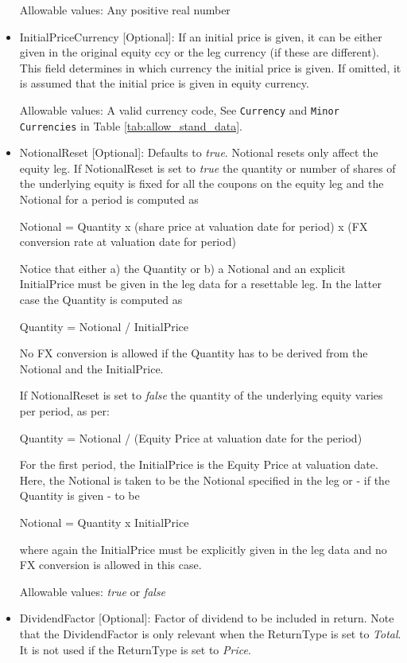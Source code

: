\begin{itemize}
Allowable values: Any positive real number

\item InitialPriceCurrency [Optional]: If an initial price is given, it can be either given in the original equity ccy
  or the leg currency (if these are different). This field determines in which currency the initial price is given. If
  omitted, it is assumed that the initial price is given in equity currency.

Allowable values: A valid currency code, See \lstinline!Currency! and \lstinline!Minor Currencies! in Table \ref{tab:allow_stand_data}.

\item NotionalReset [Optional]: Defaults to \emph{true}.  Notional resets only affect the equity leg. If NotionalReset
  is set to \emph{true} the quantity or number of shares of the underlying equity is fixed for all the coupons on the
  equity leg and the Notional for a period is computed as

  Notional = Quantity x (share price at valuation date for period) x (FX conversion rate at valuation date for period)

  Notice that either a) the Quantity or b) a Notional and an explicit InitialPrice must be given in the leg data for a
  resettable leg. In the latter case the Quantity is computed as

  Quantity = Notional / InitialPrice

  No FX conversion is allowed if the Quantity has to be derived from the Notional and the InitialPrice.

  If NotionalReset is set to \emph{false} the quantity of the underlying equity varies per period, as per:
  
  Quantity = Notional / (Equity Price at valuation date for the period)

For the first period, the InitialPrice is the Equity Price at valuation date.
Here, the Notional is taken to be the Notional specified in the leg or - if the Quantity is given - to be

  Notional = Quantity x InitialPrice

  where again the InitialPrice must be explicitly given in the leg data and no FX conversion is allowed in this case.

  Allowable values:  \emph{true} or  \emph{false}

\item DividendFactor [Optional]: Factor of dividend to be included in return. Note that the DividendFactor is only relevant when the ReturnType is set to  \emph{Total}. It is not used if the ReturnType is set to \emph{Price}.


\end{itemize}
